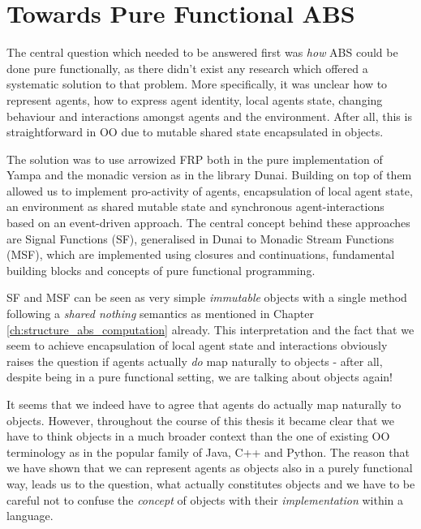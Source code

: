 \section{Towards Pure Functional ABS}
The central question which needed to be answered first was \textit{how} ABS could be done pure functionally, as there didn't exist any research which offered a systematic solution to that problem. More specifically, it was unclear how to represent agents, how to express agent identity, local agents state, changing behaviour and interactions amongst agents and the environment. After all, this is straightforward in OO due to mutable shared state encapsulated in objects.

The solution was to use arrowized FRP both in the pure implementation of Yampa and the monadic version as in the library Dunai. Building on top of them allowed us to implement pro-activity of agents, encapsulation of local agent state, an environment as shared mutable state and synchronous agent-interactions based on an event-driven approach. The central concept behind these approaches are Signal Functions (SF), generalised in Dunai to Monadic Stream Functions (MSF), which are implemented using closures and continuations, fundamental building blocks and concepts of pure functional programming. 


SF and MSF can be seen as very simple \textit{immutable} objects with a single method following a \textit{shared nothing} semantics as mentioned in Chapter \ref{ch:structure_abs_computation} already. This interpretation and the fact that we seem to achieve encapsulation of local agent state and interactions obviously raises the question if agents actually \textit{do} map naturally to objects - after all, despite being in a pure functional setting, we are talking about objects again!

It seems that we indeed have to agree that agents do actually map naturally to objects. However, throughout the course of this thesis it became clear that we have to think objects in a much broader context than the one of existing OO terminology as in the popular family of Java, C++ and Python. The reason that we have shown that we can represent agents as objects also in a purely functional way, leads us to the question, what actually constitutes objects and we have to be careful not to confuse the \textit{concept} of objects with their \textit{implementation} within a language.

